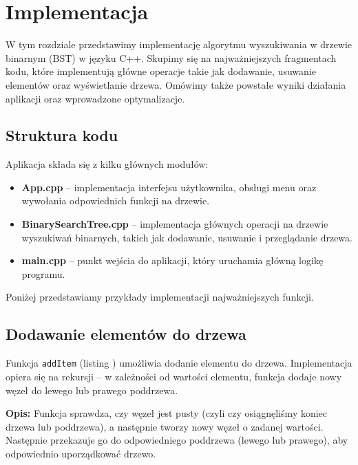 \newpage
\section{Implementacja}

W tym rozdziale przedstawimy implementację algorytmu wyszukiwania w drzewie binarnym (BST) w języku C++. Skupimy się na najważniejszych fragmentach kodu, które implementują główne operacje takie jak dodawanie, usuwanie elementów oraz wyświetlanie drzewa. Omówimy także powstałe wyniki działania aplikacji oraz wprowadzone optymalizacje.

\subsection{Struktura kodu}

Aplikacja składa się z kilku głównych modułów:

\begin{itemize}
	\item \textbf{App.cpp} – implementacja interfejsu użytkownika, obsługi menu oraz wywołania odpowiednich funkcji na drzewie.
	\item \textbf{BinarySearchTree.cpp} – implementacja głównych operacji na drzewie wyszukiwań binarnych, takich jak dodawanie, usuwanie i przeglądanie drzewa.
	\item \textbf{main.cpp} – punkt wejścia do aplikacji, który uruchamia główną logikę programu.
\end{itemize}

Poniżej przedstawiamy przykłady implementacji najważniejszych funkcji.

\subsection{Dodawanie elementów do drzewa}

Funkcja \texttt{addItem} (listing ) umożliwia dodanie elementu do drzewa. Implementacja opiera się na rekursji – w zależności od wartości elementu, funkcja dodaje nowy węzeł do lewego lub prawego poddrzewa.



\textbf{Opis:} Funkcja sprawdza, czy węzeł jest pusty (czyli czy osiągnęliśmy koniec drzewa lub poddrzewa), a następnie tworzy nowy węzeł o zadanej wartości. Następnie przekazuje go do odpowiedniego poddrzewa (lewego lub prawego), aby odpowiednio uporządkować drzewo.

